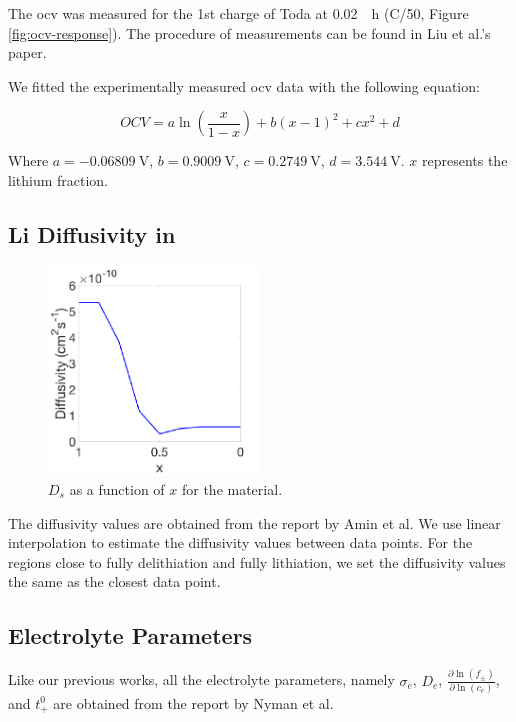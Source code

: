 \documentclass{article}
\begin{document}
The \gls{ocv} was measured for the 1st charge of Toda \nca{} at
\SI{0.02}{\per\hour} (C/50, Figure \ref{fig:ocv-response}). The
procedure of measurements can be found in Liu et al.'s
paper\cite{liu2017}.

We fitted the experimentally measured \gls{ocv} data with the
following equation:

\begin{equation}
  \mathit{OCV}=a\ln \left(\frac x{1-x}\right)+b\left(x-1\right)^2+cx^2+d
  \label{eq:12}
\end{equation}

Where $a=\SI{-0.06809}{\volt}$, $b=\SI{0.9009}{\volt}$,
$c=\SI{0.2749}{\volt}$, $d=\SI{3.544}{\volt}$. $x$ represents the
lithium fraction.

\subsection{Li Diffusivity in \nca{}}

\begin{figure}
  \includegraphics[width=0.5\textwidth]{diffusivity.pdf}
  \caption{$D_s$ as a function of $x$ for the \nca{} material\cite{amin2015}.}
  \label{fig:diffusivity}
\end{figure}

The diffusivity values are obtained from the report by Amin et
al\cite{amin2015}. We use linear interpolation to estimate the
diffusivity values between data points. For the regions close to
fully delithiation and fully lithiation, we set the diffusivity values
the same as the closest data point.

\subsection{Electrolyte Parameters}

Like our previous works\cite{dasgupta2020,dasgupta2020-2}, all the electrolyte parameters,
namely $\sigma_e$, $D_e$, $\frac{\partial \ln
  \left(f_\pm\right)}{\partial \ln \left(c_e\right)}$, and $t_+^0$ are
obtained from the report by Nyman et al\cite{lindbergh2008}.
\end{document}
